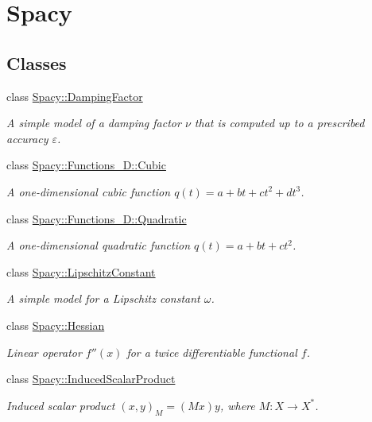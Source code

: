 \hypertarget{group__SpacyGroup}{}\section{Spacy}
\label{group__SpacyGroup}
\subsection*{Classes}
\begin{DoxyCompactItemize}
\item 
class \hyperlink{classSpacy_1_1DampingFactor}{Spacy\+::\+Damping\+Factor}
\begin{DoxyCompactList}\small\item\em A simple model of a damping factor $\nu$ that is computed up to a prescribed accuracy $\varepsilon$. \end{DoxyCompactList}\item 
class \hyperlink{classSpacy_1_1Functions__1D_1_1Cubic}{Spacy\+::\+Functions\+\_\+D\+::\+Cubic}
\begin{DoxyCompactList}\small\item\em A one-\/dimensional cubic function $q(t) = a + bt + ct^2 + dt^3$. \end{DoxyCompactList}\item 
class \hyperlink{classSpacy_1_1Functions__1D_1_1Quadratic}{Spacy\+::\+Functions\+\_\+D\+::\+Quadratic}
\begin{DoxyCompactList}\small\item\em A one-\/dimensional quadratic function $q(t) = a + bt + ct^2$. \end{DoxyCompactList}\item 
class \hyperlink{classSpacy_1_1LipschitzConstant}{Spacy\+::\+Lipschitz\+Constant}
\begin{DoxyCompactList}\small\item\em A simple model for a Lipschitz constant $\omega$. \end{DoxyCompactList}\item 
class \hyperlink{classSpacy_1_1Hessian}{Spacy\+::\+Hessian}
\begin{DoxyCompactList}\small\item\em Linear operator $f''(x)$ for a twice differentiable functional $f$. \end{DoxyCompactList}\item 
class \hyperlink{classSpacy_1_1InducedScalarProduct}{Spacy\+::\+Induced\+Scalar\+Product}
\begin{DoxyCompactList}\small\item\em Induced scalar product $(x,y)_M = (Mx)y$, where $M:X\rightarrow X^*$. \end{DoxyCompactList}\item 

\end{DoxyCompactItemize}
